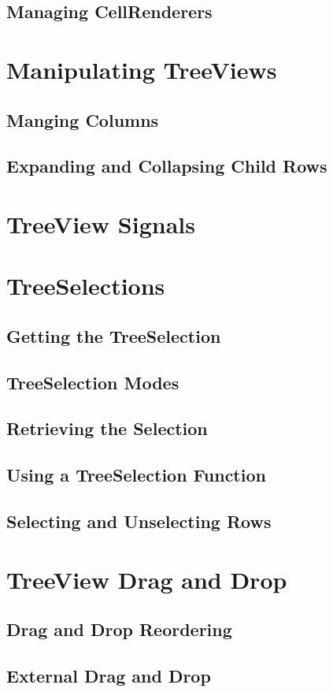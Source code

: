 \subsection{Managing CellRenderers}
\section{Manipulating TreeViews}
\subsection{Manging Columns}
\subsection{Expanding and Collapsing Child Rows}
\section{TreeView Signals}
\section{TreeSelections}
\subsection{Getting the TreeSelection}
\subsection{TreeSelection Modes}
\subsection{Retrieving the Selection}
\subsection{Using a TreeSelection Function}
\subsection{Selecting and Unselecting Rows}
\section{TreeView Drag and Drop}
	\subsection{Drag and Drop Reordering}
	\subsection{External Drag and Drop}

